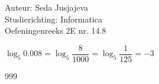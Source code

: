 \documentclass[a4paper]{article}
\begin{document}
\noindent \large Auteur: Seda Jusjajeva\\
\noindent \large Studierichting: Informatica\\
\noindent \large Oefeningenreeks 2E nr. 14.8 \\

\medskip

\normalsize


$\log_5 0.008 = \log_5\dfrac{8}{1000} = \log_5\dfrac{1}{125} = -3$ \\



\begin{thebibliography}{999}
\end{thebibliography}
\end{document}

